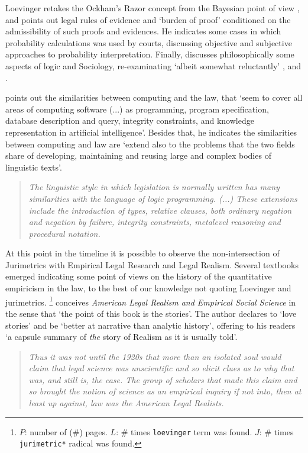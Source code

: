 \documentclass[a4paper]{exam}
\theoremstyle{plain}
\begin{document}
Loevinger retakes the Ockham's Razor concept from the Bayesian point of view \cite{jefferys1992ockham}, and points out legal rules of evidence and `burden of proof' conditioned on the admissibility of such proofs and evidences. He indicates some cases in which probability calculations was used by courts, discussing objective and subjective approaches to probability interpretation. Finally, \cite{loevinger1992logic} discusses philosophically some aspects of logic and Sociology, re-examinating `albeit somewhat reluctantly' \cite{kaye1992proof}, \cite{loevinger1992standards} and \cite{jasanoff1992judges}. 

\cite{kowalski1995legislation} points out the similarities between computing and the law, that `seem to cover all areas of computing software (...) as programming, program specification, database description and query, integrity constraints, and knowledge representation in artificial intelligence'. Besides that, he indicates the similarities between computing and law are `extend also to the problems that the two fields share of developing, maintaining and reusing large and complex bodies of linguistic texts'.
\begin{quote}
\textit{The linguistic style in which legislation is normally written has many similarities with the language of logic programming. (...) These extensions include the introduction of types, relative clauses, both ordinary negation and negation by failure, integrity constraints, metalevel reasoning and procedural notation.} \cite[p. 325]{kowalski1995legislation}
\end{quote}


At this point in the timeline it is possible to observe the non-intersection of Jurimetrics with Empirical Legal Research and Legal Realism. Several textbooks emerged indicating some point of views on the history of the quantitative empiricism in the law, to the best of our knowledge not quoting Loevinger and jurimetrics. \cite[$P=432, L=0, J=0$]{schlegel1995american}\footnote{$P$: number of (\#) pages. $L$: \# times \texttt{loevinger} term was found. $J$: \# times \texttt{jurimetric*} radical was found.} conceives \textit{American Legal Realism and Empirical Social Science} in the sense that `the point of this book is the stories'. The author declares to `love stories' and be `better at narrative than analytic history', offering to his readers `a capsule summary of \textit{the} story of Realism as it is usually told'.
\begin{quote}
\textit{Thus it was not until the 1920s that more than an isolated soul would claim that legal science was unscientific and so elicit clues as to why that was, and still is, the case. The group of scholars that made this claim and so brought the notion of science as an empirical inquiry if not into, then at least up against, law was the American Legal Realists.} \cite[p. 1]{schlegel1995american}
\end{quote}
\end{document}
